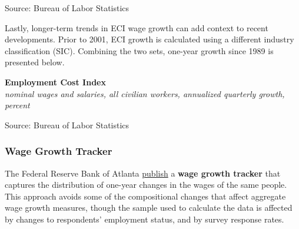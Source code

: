 \documentclass{report}
\makeatletter
\newcommand{\tbllink}[1]{\href{https://raw.githubusercontent.com/bdecon/US-chartbook/master/chartbook/data/#1}{\faTable}}
\newcommand*\short[1]{\expandafter\@gobbletwo\number\numexpr#1\relax}
\newcommand{\absnode}[3]{\node[below right, align=left] at (axis cs: #1,#2) {#3};}
\newcommand{\dateaxisticks}{
		date coordinates in=x, axis line style={draw=none},
		xmax={2023-11-30},
		max space between ticks=40,	    
		xtick={{1990-01-01}, {1992-01-01}, {1994-01-01}, 
			{1996-01-01}, {1998-01-01}, {2000-01-01}, 
			{2002-01-01}, {2004-01-01}, {2006-01-01},
			{2008-01-01}, {2010-01-01}, {2012-01-01}, {2014-01-01},
		    {2016-01-01}, {2018-01-01}, {2020-01-01}, {2022-01-01}, 
		    {2024-01-01}, {2026-01-01}},
		minor xtick={{1989-01-01}, {1991-01-01}, {1993-01-01},
			{1995-01-01}, {1997-01-01}, {1999-01-01}, 
			{2001-01-01}, {2003-01-01}, {2005-01-01}, {2007-01-01},
		    {2009-01-01}, {2011-01-01}, {2013-01-01}, {2015-01-01},
		    {2017-01-01}, {2019-01-01}, {2021-01-01}, {2023-01-01}, 
		    {2025-01-01}, {2027-01-01}},
		enlarge y limits={0.06}, enlarge x limits={0.01},
		xticklabel style={align=center, yshift=-2pt}, tick label style={inner sep=0pt},
		}
\newcommand{\bbar}[2]{extra #1 ticks = {{#2}}, extra #1 tick labels = ,
		extra #1 tick style = {grid=major, grid style={thick, black!25}},}
\newcommand{\rbars}{
		\fill[color=black!10] (axis cs:{1990-07-01},\pgfkeysvalueof{/pgfplots/ymin}) rectangle 
			(axis cs:{1991-03-01}, \pgfkeysvalueof{/pgfplots/ymax});
		\fill[color=black!10] (axis cs:{2007-12-01},\pgfkeysvalueof{/pgfplots/ymin}) rectangle 
			(axis cs:{2009-07-01}, \pgfkeysvalueof{/pgfplots/ymax});
		\fill[color=black!10] (axis cs:{2001-03-01},\pgfkeysvalueof{/pgfplots/ymin}) rectangle 
			(axis cs:{2001-11-01}, \pgfkeysvalueof{/pgfplots/ymax});
		\fill[color=black!10] (axis cs:{2020-02-01},\pgfkeysvalueof{/pgfplots/ymin}) rectangle 
			(axis cs:{2020-05-01}, \pgfkeysvalueof{/pgfplots/ymax});}
\makeatother
\begin{document}
{\begin{minipage}{0.415\textwidth}
\footnotesize{Source: Bureau of Labor Statistics} \hfill \tbllink{eci_qq.csv}
\end{minipage}
\vspace{1mm}

\begin{minipage}{0.76\textwidth}
\small Lastly, longer-term trends in ECI wage growth can add context to recent developments. Prior to 2001, ECI growth is calculated using a different industry classification (SIC). Combining the two sets, one-year growth since 1989 is presented below.
\vspace{1mm}

\normalsize \textbf{Employment Cost Index}\\
\footnotesize{\textit{nominal wages and salaries, all civilian workers, annualized quarterly growth, percent}}
\vspace{2.2cm}

\hspace{1mm}  

\footnotesize{Source: Bureau of Labor Statistics} \hfill \tbllink{eci_yy.csv}
\end{minipage}
\newpage
\begin{minipage}{0.76\textwidth}   
\subsubsection*{Wage Growth Tracker}
\small The Federal Reserve Bank of Atlanta \href{https://www.frbatlanta.org/chcs/wage-growth-tracker}{publish} a \textbf{wage growth tracker} that captures the distribution of one-year changes in the wages of the same people. This approach avoids some of the compositional changes that affect aggregate wage growth measures, though the sample used to calculate the data is affected by changes to respondents' employment status, and by survey response rates. 


\end{minipage}}
\end{document}
